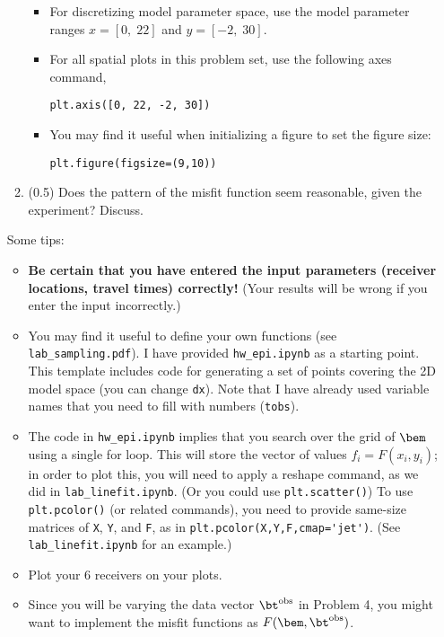 \documentclass[11pt,titlepage,fleqn]{article}
\begin{document}
\begin{enumerate}
\begin{enumerate}
\begin{itemize}
\item For discretizing model parameter space, use the model parameter ranges $x = [0,\;22]$ and $y = [-2,\;30]$.
\item For all spatial plots in this problem set, use the following axes command,

\verb+plt.axis([0, 22, -2, 30])+

\item You may find it useful when initializing a figure to set the figure size:

\verb+plt.figure(figsize=(9,10))+
\end{itemize}

\item (0.5) Does the pattern of the misfit function seem reasonable, given the experiment? Discuss.
\end{enumerate}

Some tips:
%
\begin{itemize}
\item {\bf Be certain that you have entered the input parameters (\eg receiver locations, travel times) correctly!} (Your results will be wrong if you enter the input incorrectly.)

\item You may find it useful to define your own functions (see \verb+lab_sampling.pdf+). I have provided \verb+hw_epi.ipynb+ as a starting point. This template includes code for generating a set of points covering the 2D model space (you can change \verb+dx+). Note that I have already used variable names that you need to fill with numbers (\eg \verb+tobs+).

\item The code in \verb+hw_epi.ipynb+ implies that you search over the grid of $\bem$ using a single for loop. This will store the vector of values $f_i = F(x_i,y_i)$; in order to plot this, you will need to apply a reshape command, as we did in \verb+lab_linefit.ipynb+. (Or you could use \verb+plt.scatter()+) To use \verb+plt.pcolor()+ (or related commands), you need to provide same-size matrices of \verb+X+, \verb+Y+, and \verb+F+, as in \verb+plt.pcolor(X,Y,F,cmap='jet')+. (See \verb+lab_linefit.ipynb+ for an example.)

\item Plot your 6 receivers on your plots. 

\item Since you will be varying the data vector $\bt^{\rm obs}$ in Problem 4, you might want to implement the misfit functions as $F(\bem,\bt^{\rm obs})$.

\end{itemize}

\end{enumerate}
\end{document}
